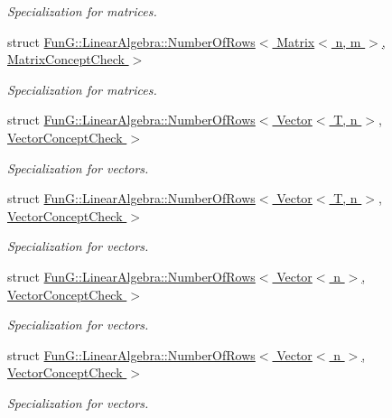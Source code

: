\begin{DoxyCompactItemize}
\begin{DoxyCompactList}\small\item\em \-Specialization for matrices. \end{DoxyCompactList}\item 
struct \hyperlink{structFunG_1_1LinearAlgebra_1_1NumberOfRows_3_01Matrix_3_01n_00_01m_01_4_00_01MatrixConceptCheck_01_4}{\-Fun\-G\-::\-Linear\-Algebra\-::\-Number\-Of\-Rows$<$ Matrix$<$ n, m $>$, Matrix\-Concept\-Check $>$}
\begin{DoxyCompactList}\small\item\em \-Specialization for matrices. \end{DoxyCompactList}\item 
struct \hyperlink{structFunG_1_1LinearAlgebra_1_1NumberOfRows_3_01Vector_3_01T_00_01n_01_4_00_01VectorConceptCheck_01_4}{\-Fun\-G\-::\-Linear\-Algebra\-::\-Number\-Of\-Rows$<$ Vector$<$ T, n $>$, Vector\-Concept\-Check $>$}
\begin{DoxyCompactList}\small\item\em \-Specialization for vectors. \end{DoxyCompactList}\item 
struct \hyperlink{structFunG_1_1LinearAlgebra_1_1NumberOfRows_3_01Vector_3_01T_00_01n_01_4_00_01VectorConceptCheck_01_4}{\-Fun\-G\-::\-Linear\-Algebra\-::\-Number\-Of\-Rows$<$ Vector$<$ T, n $>$, Vector\-Concept\-Check $>$}
\begin{DoxyCompactList}\small\item\em \-Specialization for vectors. \end{DoxyCompactList}\item 
struct \hyperlink{structFunG_1_1LinearAlgebra_1_1NumberOfRows_3_01Vector_3_01n_01_4_00_01VectorConceptCheck_01_4}{\-Fun\-G\-::\-Linear\-Algebra\-::\-Number\-Of\-Rows$<$ Vector$<$ n $>$, Vector\-Concept\-Check $>$}
\begin{DoxyCompactList}\small\item\em \-Specialization for vectors. \end{DoxyCompactList}\item 
struct \hyperlink{structFunG_1_1LinearAlgebra_1_1NumberOfRows_3_01Vector_3_01n_01_4_00_01VectorConceptCheck_01_4}{\-Fun\-G\-::\-Linear\-Algebra\-::\-Number\-Of\-Rows$<$ Vector$<$ n $>$, Vector\-Concept\-Check $>$}
\begin{DoxyCompactList}\small\item\em \-Specialization for vectors. \end{DoxyCompactList}\item 

\end{DoxyCompactItemize}
